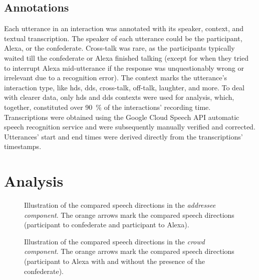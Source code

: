 \subsection*{Annotations}
\label{subsec:annotations_hhci}

Each utterance in an interaction was annotated with its speaker, context, and textual transcription.
The speaker of each utterance could be the participant, Alexa, or the confederate.
Cross-talk was rare, as the participants typically waited till the confederate or Alexa finished talking (except for when they tried to interrupt Alexa mid-utterance if the response was unquestionably wrong or irrelevant due to a recognition error).
The context marks the utterance's interaction type, like \ac{hds}, \ac{dds}, cross-talk, off-talk, laughter, and more.
To deal with clearer data, only \ac{hds} and \ac{dds} contexts were used for analysis, which, together, constituted over \SI{90}{\percent} of the interactions' recording time.
Transcriptions were obtained using the Google Cloud Speech API automatic speech recognition service and were subsequently manually verified and corrected.
Utterances' start and end times were derived directly from the transcriptions' timestamps.

\section{Analysis}
\label{sec:analysis_hhci}

\begin{figure}[t]
	\centering
	\hfill
	\caption[\acs{hds} and \acs{dds} compared in confederate condition]
		{Illustration of the compared speech directions in the \emph{addressee component}.
		The orange arrows mark the compared speech directions (participant to confederate and participant to Alexa).}
	\label{fig:condition_comparison_addressee}
\end{figure}

\begin{figure}[t]
	\centering
	\hfill
	\caption[\acs{dds} compared in solo and confederate conditions]
		{Illustration of the compared speech directions in the \emph{crowd component}.
		The orange arrows mark the compared speech directions (participant to Alexa with and without the presence of the confederate).}
	\label{fig:condition_comparison_crowd}
\end{figure}

